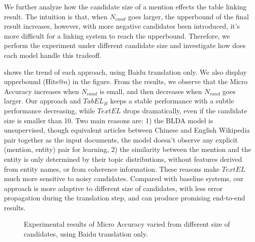 We further analyze how the candidate size of a mention effects the table linking result.
The intuition is that, when $N_{cand}$ goes larger, the upperbound of the final result increases,
however, with more negative candidates been introduced, it's more difficult for a linking
system to reach the upperbound.
Therefore, we perform the experiment under different candidate size and investigate how
does each model handle this tradeoff.

 shows the trend of each approach, using Baidu translation only.
We also display upperbound (Hits@$n$) in the figure.
From the results, we observe that the Micro Accuracy increases when $N_{cand}$ is small,
and then decreases when $N_{cand}$ goes larger.
Our approach and $TabEL_B$ keeps a stable performance with a subtle performance decreasing, 
while $TextEL$ drops dramatically, even if the candidate size is smaller than 10.
Two main reasons are:
1) the BLDA model is unsupervised, though equivalent articles between
Chinese and English Wikipedia pair together as the input documents, the model doesn't observe
any explicit (mention, entity) pair for learning,
2) the similarity between the mention and the entity is only determined by their topic
distributions, without features derived from entity names, or from coherence information.
These reasons make $TextEL$ much more sensitive to noisy candidates.
Compared with baseline systems, our approach is more adaptive to different size of candidates,
with less error propagation during the translation step,
and can produce promising end-to-end results.


\begin{figure}[th]
\centering
\caption{Experimental results of Micro Accuracy varied from different size of candidates,
using Baidu translation only.}
\label{fig:main-result}
\end{figure}

